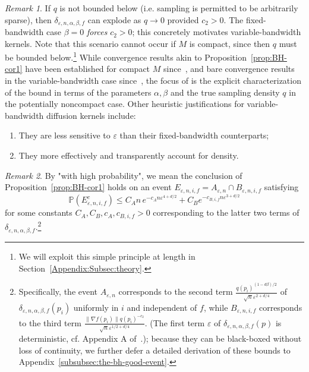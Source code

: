 \documentclass{article}
\newcommand{\jake}[1]{}
\newcommand{\kelly}[1]{}
\theoremstyle{remark}
\newtheorem{remark}{Remark}
\theoremstyle{plain}
\begin{document}
\begin{remark}
\label{remark:BH-purpose}
    If \( q \) is not bounded below (i.e. sampling is permitted to be arbitrarily sparse), then \( \delta_{\varepsilon, n, \alpha, \beta, f}  \) can explode as \( q \to 0 \) provided \( c_{2} > 0 \). The fixed-bandwidth case \( \beta=0 \) \textit{forces} \( c_{2} >0\); this concretely motivates variable-bandwidth kernels. Note that this scenario cannot occur if \( M \) is compact, since then \( q \) must be bounded below.\footnote{We will exploit this simple principle at length in Section~\ref{Appendix:Subsec:theory}.} While convergence results akin to Proposition~\ref{prop:BH-cor1} have been established for compact \( M \) since~\cite{coifman2006diffusion}, and bare convergence results in the variable-bandwidth case since~\cite{ting2010analysis}, the focus of \cite{Berry2016} is the explicit characterization of the bound in terms of the parameters \( \alpha, \beta \) and the true sampling density \(  q\) in the potentially noncompact case. Other heuristic justifications for variable-bandwidth diffusion kernels include:
    \begin{enumerate}
        \item They are less sensitive to \( \varepsilon \) than their fixed-bandwidth counterparts;
        \item They more effectively and transparently account for density.
    \end{enumerate}
\end{remark}

\begin{remark}
\label{rmk:whp-explanation}
   {By "with high probability", we mean the conclusion of Proposition~\ref{prop:BH-cor1} holds on an event $E_{\varepsilon, n, i , f}=A_{\varepsilon, n} \cap B_{\varepsilon, n, i ,f}$ satisfying}
\begin{equation}
\mathbb{P}(E_{\varepsilon, n, i, f}^{c}) \leq C_A n  \, e^{- c_{A}n \varepsilon^{4+ d/ 2}}+C_{B}e^{-c_{B,i, f}n \varepsilon^{3+d/2}}
\end{equation}
{for some constants $C_{A},C_{B},c_{A},c_{B,i, f}>0$ corresponding to the latter two terms of \( \delta_{\varepsilon, n, \alpha, \beta, f} \).}\footnote{Specifically, the event $A_{\varepsilon, n}$ corresponds to the second term $\frac{q(p_{i})^{(1- d \beta)/2}}{\sqrt{ n }\varepsilon^{2+ d/ 4}}$ of $\delta_{\varepsilon, n, \alpha, \beta, f}(p_{i})$ uniformly in $i$ and independent of $f$, while $B_{\varepsilon, n, i, f}$ corresponds to the third term $\frac{\|\nabla f(p_{i})\| q(p_{i})^{-c_{2}}}{\sqrt{ n } \varepsilon^{1/2+d/4}}$. (The first term $\varepsilon$ of $\delta_{\varepsilon, n, \alpha, \beta, f}(p)$ is deterministic, cf. Appendix A of~\cite{Berry2016}.); because they can be black-boxed without loss of continuity, we further defer a detailed derivation of these bounds to Appendix~\ref{subsubsec:the-bh-good-event}.}



\end{remark}
\end{document}
